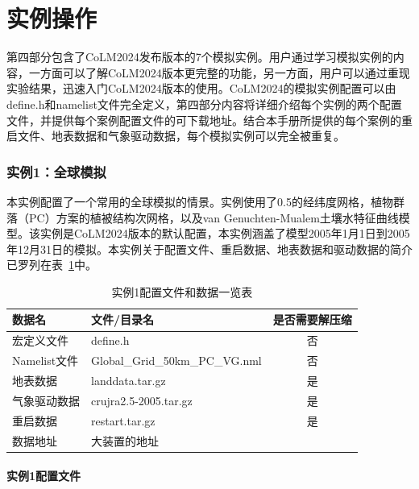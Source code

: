 \part{实例操作}

第四部分包含了CoLM2024发布版本的7个模拟实例。用户通过学习模拟实例的内容，一方面可以了解CoLM2024版本更完整的功能，另一方面，用户可以通过重现实验结果，迅速入门CoLM2024版本的使用。CoLM2024的模拟实例配置可以由define.h和namelist文件完全定义，第四部分内容将详细介绍每个实例的两个配置文件，并提供每个案例配置文件的可下载地址。结合本手册所提供的每个案例的重启文件、地表数据和气象驱动数据，每个模拟实例可以完全被重复。

\section{实例1：全球模拟}

本实例配置了一个常用的全球模拟的情景。实例使用了0.5\textdegree 的经纬度网格，植物群落（PC）方案的植被结构次网格，以及van Genuchten-Mualem土壤水特征曲线模型。该实例是CoLM2024版本的默认配置，本实例涵盖了模型2005年1月1日到2005年12月31日的模拟。本实例关于配置文件、重启数据、地表数据和驱动数据的简介已罗列在表~\ref{ex1table}中。

\begin{table}[htbp]
\caption{实例1配置文件和数据一览表}
\centering \renewcommand{\arraystretch}{1.5}
\label{ex1table}
\begin{tabular}{llc}
\toprule
\textbf{数据名} & \textbf{文件/目录名} & \textbf{是否需要解压缩} \\\midrule

宏定义文件 & define.h & 否 \\
Namelist文件 & Global\_Grid\_50km\_PC\_VG.nml & 否 \\
地表数据 & landdata.tar.gz & 是 \\
气象驱动数据 & crujra2.5-2005.tar.gz & 是 \\
重启数据 & restart.tar.gz & 是 \\

\midrule

数据地址 & \multicolumn{2}{l}{大装置的地址}\\
\bottomrule
\end{tabular}
\end{table}


\subsection{实例1配置文件}\label{ex1config}

